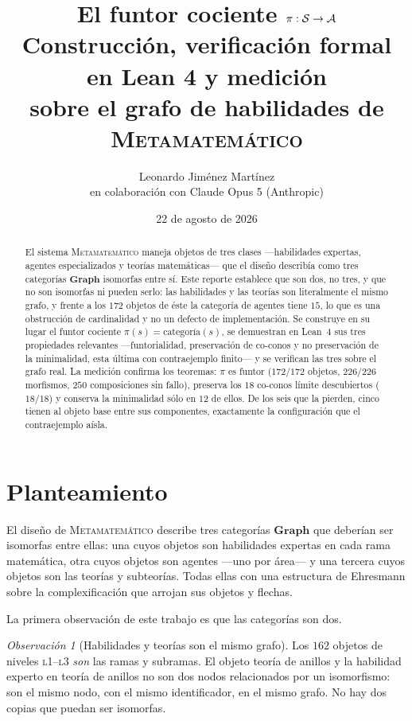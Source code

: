 \documentclass[11pt,a4paper]{article}
\title{El funtor cociente $\pi:\mathcal{S}\to\mathcal{A}$\\[.3em]
\large Construcción, verificación formal en Lean 4 y medición\\
sobre el grafo de habilidades de \textsc{Metamatemático}}
\author{Leonardo Jiménez Martínez\\ \small en colaboración con Claude Opus 5 (Anthropic)}
\date{22 de agosto de 2026}
\theoremstyle{plain}
\theoremstyle{definition}
\theoremstyle{remark}
\newtheorem{observacion}[teorema]{Observación}
\begin{document}
\maketitle

\begin{abstract}
El sistema \textsc{Metamatemático} maneja objetos de tres clases —habilidades
expertas, agentes especializados y teorías matemáticas— que el diseño describía
como tres categorías $\mathbf{Graph}$ isomorfas entre sí. Este reporte establece
que son dos, no tres, y que no son isomorfas ni pueden serlo: las habilidades y
las teorías son literalmente el mismo grafo, y frente a los $172$ objetos de
éste la categoría de agentes tiene $15$, lo que es una obstrucción de
cardinalidad y no un defecto de implementación. Se construye en su lugar el
funtor cociente $\pi(s)=\text{categoría}(s)$, se demuestran en Lean~4 sus tres
propiedades relevantes —funtorialidad, preservación de co-conos y no
preservación de la minimalidad, esta última con contraejemplo finito— y se
verifican las tres sobre el grafo real. La medición confirma los teoremas:
$\pi$ es funtor ($172/172$ objetos, $226/226$ morfismos, $250$ composiciones sin
fallo), preserva los $18$ co-conos límite descubiertos ($18/18$) y conserva la
minimalidad sólo en $12$ de ellos. De los seis que la pierden, cinco tienen al
objeto base entre sus componentes, exactamente la configuración que el
contraejemplo aísla.
\end{abstract}

\tableofcontents

\section{Planteamiento}

El diseño de \textsc{Metamatemático} describe tres categorías $\mathbf{Graph}$
que deberían ser isomorfas entre ellas: una cuyos objetos son habilidades
expertas en cada rama matemática, otra cuyos objetos son agentes —uno por área—
y una tercera cuyos objetos son las teorías y subteorías. Todas ellas con una
estructura de Ehresmann sobre la complexificación que arrojan sus objetos y
flechas.

La primera observación de este trabajo es que las categorías son dos.

\begin{observacion}[Habilidades y teorías son el mismo grafo]
Los $162$ objetos de niveles \textsc{l1}--\textsc{l3} \emph{son} las ramas y
subramas. El objeto \guillemotleft{}teoría de anillos\guillemotright{} y la habilidad \guillemotleft{}experto en teoría de
anillos\guillemotright{} no son dos nodos relacionados por un isomorfismo: son el mismo nodo,
con el mismo identificador, en el mismo grafo. No hay dos copias que puedan ser
isomorfas.
\end{observacion}
\end{document}
